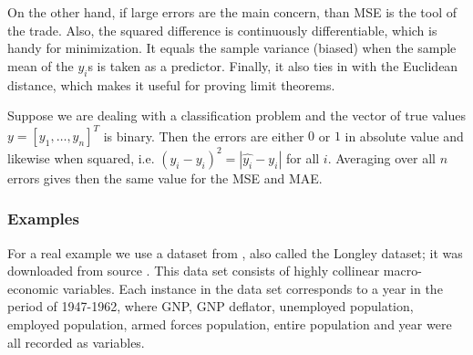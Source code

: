 \documentclass{llncs}
\begin{document}
On the other hand, if large errors are the main concern, than MSE is the tool of the trade. Also, the squared difference is continuously differentiable, which is handy for minimization. It equals the sample variance (biased) when the sample mean of the $y_{i}$s is taken as a predictor. Finally, it also ties in with the Euclidean distance, which makes it useful for proving limit theorems.

Suppose we are dealing with a classification problem and the vector of true values $y=[y_{1},\dots,y_{n}]^{T}$ is binary. Then the errors are either $0$ or $1$ in absolute value and likewise when squared, i.e. $(\hat{y_{i}} - y_{i})^{2}=|\hat{y_{i}}-y_{i}|$ for all $i$. Averaging over all $n$ errors gives then the same value for the MSE and MAE.

\subsubsection{Examples}
For a real example we use a dataset from \cite{Longl}, also called the Longley dataset; it was downloaded from source \cite{WinNT}. This data set consists of highly collinear macro-economic variables. Each instance in the data set corresponds to a year in the period of 1947-1962, where GNP, GNP deflator, unemployed population, employed population, armed forces population, entire population and year were all recorded as variables.

\end{document}
